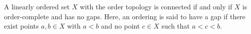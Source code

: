 A linearly ordered set $X$ with the order topology is connected if and only if $X$ is order-complete and has no gaps. Here, an ordering is said to have a gap if there exist points $a, b \in X$ with $a < b$ and no point $c \in X$ such that $a < c < b$.
